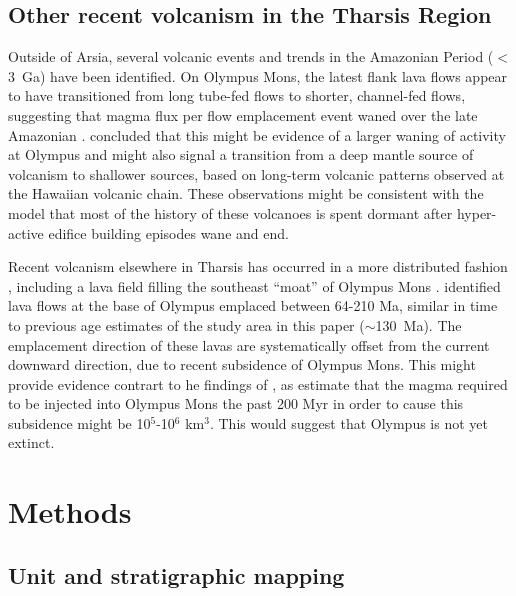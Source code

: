 \documentclass[12pt,letter]{article}
\begin{document}
\subsection{Other recent volcanism in the Tharsis Region}

Outside of Arsia, several volcanic events and trends in the Amazonian Period ($<$3~Ga) have been identified. On Olympus Mons, the latest flank lava flows appear to have transitioned from long tube-fed flows to shorter, channel-fed flows, suggesting that magma flux per flow emplacement event waned over the late Amazonian \citep{bleacher2007olympus}. \citet{bleacher2007olympus} concluded that this might be evidence of a larger waning of activity at Olympus and might also signal a transition from a deep mantle source of volcanism to shallower sources, based on long-term volcanic patterns observed at the Hawaiian volcanic chain. These observations might be consistent with the \citet{wilson2001evidence} model that most of the history of these volcanoes is spent dormant after hyper-active edifice building episodes wane and end.

Recent volcanism elsewhere in Tharsis has occurred in a more distributed fashion \citep{hauber2011very}, including a lava field filling the southeast ``moat'' of Olympus Mons \citep{chadwick2015late}. \citet{chadwick2015late} identified lava flows at the base of Olympus emplaced between 64-210 Ma, similar in time to previous age estimates of the study area in this paper ($\sim$130~Ma). The emplacement direction of these lavas are systematically offset from the current downward direction, due to recent subsidence of Olympus Mons. This might provide evidence contrart to he findings of \citet{bleacher2007olympus}, as \citet{chadwick2015late} estimate that the magma required to be injected into Olympus Mons the past 200 Myr in order to cause this subsidence might be 10$^5$-10$^6$ km$^3$. This would suggest that Olympus is not yet extinct.

\section{Methods}

\subsection{Unit and stratigraphic mapping}
\end{document}

